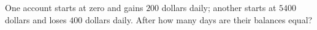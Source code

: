One account starts at zero and gains $200$ dollars daily; another starts at $5400$ dollars and loses $400$ dollars daily. After how many days are their balances equal?
